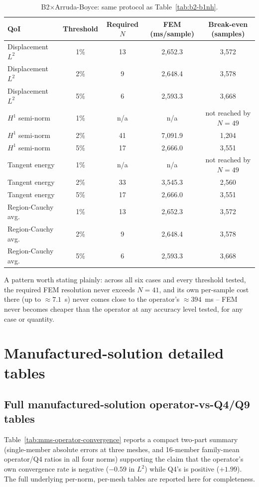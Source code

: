 \documentclass[final,5p,times]{elsarticle}
\begin{document}
\begin{table}[ht]
\centering
\caption{B2$\times$Arruda-Boyce: same protocol as Table~\ref{tab:b2-b1nh}.}
\label{tab:b2-b2ab}
\small
\begin{tabular}{lcccc}
\toprule
QoI & Threshold & Required $N$ & FEM (ms/sample) & Break-even (samples) \\
\midrule
Displacement $L^2$  & 1\% & 13  & 2{,}652.3 & 3{,}572 \\
Displacement $L^2$  & 2\% & 9   & 2{,}648.4 & 3{,}578 \\
Displacement $L^2$  & 5\% & 6   & 2{,}593.3 & 3{,}668 \\
$H^1$ semi-norm     & 1\% & n/a & n/a       & not reached by $N{=}49$ \\
$H^1$ semi-norm     & 2\% & 41  & 7{,}091.9 & 1{,}204 \\
$H^1$ semi-norm     & 5\% & 17  & 2{,}666.0 & 3{,}551 \\
Tangent energy      & 1\% & n/a & n/a       & not reached by $N{=}49$ \\
Tangent energy      & 2\% & 33  & 3{,}545.3 & 2{,}560 \\
Tangent energy      & 5\% & 17  & 2{,}666.0 & 3{,}551 \\
Region-Cauchy avg.\ & 1\% & 13  & 2{,}652.3 & 3{,}572 \\
Region-Cauchy avg.\ & 2\% & 9   & 2{,}648.4 & 3{,}578 \\
Region-Cauchy avg.\ & 5\% & 6   & 2{,}593.3 & 3{,}668 \\
\bottomrule
\end{tabular}
\end{table}

A pattern worth stating plainly: across all six cases and every
threshold tested, the required FEM resolution never exceeds $N{=}41$,
and its own per-sample cost there (up to $\approx7.1$~s) never comes
close to the operator's $\approx394$~ms -- FEM never becomes cheaper
than the operator at any accuracy level tested, for any case or
quantity.

\FloatBarrier
\section{Manufactured-solution detailed tables}
\label{app:c}
\setcounter{table}{0}

\subsection{Full manufactured-solution operator-vs-Q4/Q9 tables}
Table~\ref{tab:mms-operator-convergence} reports a compact two-part
summary (single-member absolute errors at three meshes, and 16-member
family-mean operator/Q4 ratios in all four norms) supporting the claim
that the operator's own convergence rate is negative ($-0.59$ in $L^2$)
while Q4's is positive ($+1.99$). The full underlying per-norm, per-mesh
tables are reported here for completeness.
\end{document}
